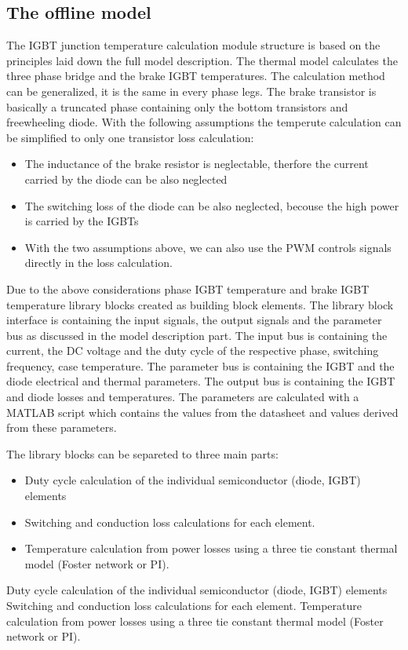 \subsection{The offline model}
The IGBT junction temperature calculation module structure is based on the principles laid down the full model description. The thermal model calculates the three phase bridge and the brake IGBT temperatures. The calculation method can be generalized, it is the same in every phase legs. The brake transistor is basically a truncated phase containing only the bottom transistors and freewheeling diode. With the following assumptions the temperute calculation can be simplified to only one transistor loss calculation:

\begin{itemize}
    \item The inductance of the brake resistor is neglectable, therfore the current carried by the diode can be also neglected
    \item The switching loss of the diode can be also neglected, becouse the high power is carried by the IGBTs
    \item With the two assumptions above, we can also use the PWM controls signals directly in the loss calculation.
\end{itemize}

Due to the above considerations phase IGBT temperature and brake IGBT temperature library blocks created as building block elements. The library block interface is containing the input signals, the output signals and the parameter bus as discussed in the model description part.
The input bus is containing the current, the DC voltage and the duty cycle of the respective phase, switching frequency, case temperature. The parameter bus is containing the IGBT and the diode electrical and thermal parameters. The output bus is containing the IGBT and diode losses and temperatures. The parameters are calculated with a MATLAB script which contains the values from the datasheet and values derived from these parameters.

The library blocks can be separeted to three main parts:
\begin{itemize}
    \item Duty cycle calculation of the individual semiconductor (diode, IGBT) elements
    \item Switching and conduction loss calculations for each element.
    \item Temperature calculation from power losses using a three tie constant thermal model (Foster network or PI). 
\end{itemize}
Duty cycle calculation of the individual semiconductor (diode, IGBT) elements
Switching and conduction loss calculations for each element.
Temperature calculation from power losses using a three tie constant thermal model (Foster network or PI). 

